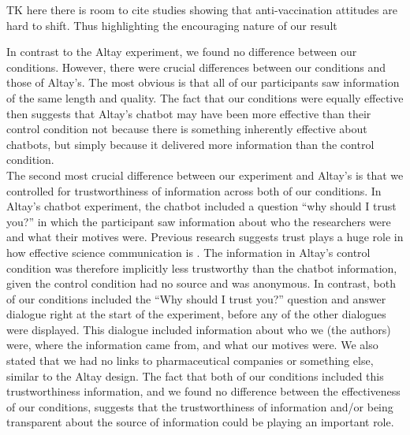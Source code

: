 \documentclass[
  english,
  ,jou,floatsintext]{apa6}
\begin{document}
TK here there is room to cite studies showing that anti-vaccination attitudes are hard to shift. Thus highlighting the encouraging nature of our result

In contrast to the Altay experiment, we found no difference between our conditions. However, there were crucial differences between our conditions and those of Altay's. The most obvious is that all of our participants saw information of the same length and quality. The fact that our conditions were equally effective then suggests that Altay's chatbot may have been more effective than their control condition not because there is something inherently effective about chatbots, but simply because it delivered more information than the control condition.\\
The second most crucial difference between our experiment and Altay's is that we controlled for trustworthiness of information across both of our conditions. In Altay's chatbot experiment, the chatbot included a question ``why should I trust you?'' in which the participant saw information about who the researchers were and what their motives were. Previous research suggests trust plays a huge role in how effective science communication is . The information in Altay's control condition was therefore implicitly less trustworthy than the chatbot information, given the control condition had no source and was anonymous. In contrast, both of our conditions included the ``Why should I trust you?'' question and answer dialogue right at the start of the experiment, before any of the other dialogues were displayed. This dialogue included information about who we (the authors) were, where the information came from, and what our motives were. We also stated that we had no links to pharmaceutical companies or something else, similar to the Altay design. The fact that both of our conditions included this trustworthiness information, and we found no difference between the effectiveness of our conditions, suggests that the trustworthiness of information and/or being transparent about the source of information could be playing an important role.
\end{document}
